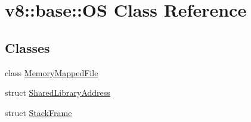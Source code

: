 \hypertarget{classv8_1_1base_1_1_o_s}{}\section{v8\+:\+:base\+:\+:OS Class Reference}
\label{classv8_1_1base_1_1_o_s}
\subsection*{Classes}
\begin{DoxyCompactItemize}
\item 
class \hyperlink{classv8_1_1base_1_1_o_s_1_1_memory_mapped_file}{Memory\+Mapped\+File}
\item 
struct \hyperlink{structv8_1_1base_1_1_o_s_1_1_shared_library_address}{Shared\+Library\+Address}
\item 
struct \hyperlink{structv8_1_1base_1_1_o_s_1_1_stack_frame}{Stack\+Frame}
\end{DoxyCompactItemize}
